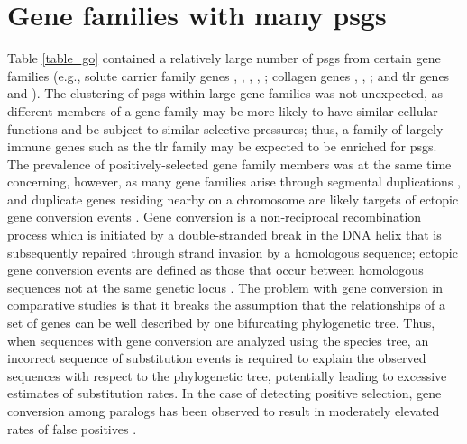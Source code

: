 \section{Gene families with many \acp{psg}}

Table \ref{table_go} contained a relatively large number of \acp{psg}
from certain gene families (e.g., solute carrier family genes
, , , ,
; collagen genes , ,
; and \ac{tlr} genes  and ). The
clustering of \acp{psg} within large gene families was not unexpected,
as different members of a gene family may be more likely to have
similar cellular functions and be subject to similar selective
pressures; thus, a family of largely immune genes such as the \ac{tlr}
family may be expected to be enriched for \acp{psg}. The prevalence of
positively-selected gene family members was at the same time
concerning, however, as many gene families arise through segmental
duplications \citep{Ohno1970}, and duplicate genes residing nearby on
a chromosome are likely targets of ectopic gene conversion events
\citep{Ezawa2006,Benovoy2009}. Gene conversion is a non-reciprocal
recombination process which is initiated by a double-stranded break in
the DNA helix that is subsequently repaired through strand invasion by
a homologous sequence; ectopic gene conversion events are defined as
those that occur between homologous sequences not at the same genetic
locus \citep{Benovoy2009}. The problem with gene conversion in
comparative studies is that it breaks the assumption that the
relationships of a set of genes can be well described by one
bifurcating phylogenetic tree. Thus, when sequences with gene
conversion are analyzed using the species tree, an incorrect sequence
of substitution events is required to explain the observed sequences
with respect to the phylogenetic tree, potentially leading to
excessive estimates of substitution rates. In the case of detecting
positive selection, gene conversion among paralogs has been observed
to result in moderately elevated rates of false positives
\citep{Casola2009}.

